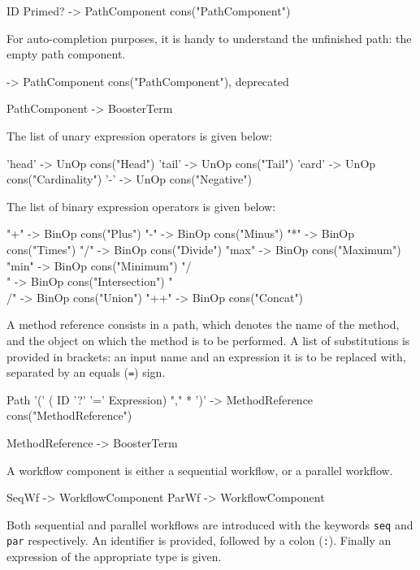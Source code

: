 \begin{code}
ID Primed? -> PathComponent {cons("PathComponent")}
\end{code}

For auto-completion purposes, it is handy to understand the unfinished
path: the empty path component.
\begin{code}
  -> PathComponent {cons("PathComponent"), deprecated}

PathComponent -> BoosterTerm
\end{code}

The list of unary expression operators is given below:

\begin{code}
'head' -> UnOp {cons("Head")}
'tail' -> UnOp {cons("Tail")}
'card' -> UnOp {cons("Cardinality")}
'-'    -> UnOp {cons("Negative")}
\end{code}

The list of binary expression operators is given below:

\begin{code}
"+"	-> BinOp {cons("Plus")}
"-" 	-> BinOp {cons("Minus")}
"*" 	-> BinOp {cons("Times")}
"/" 	-> BinOp {cons("Divide")}
"max" 	-> BinOp {cons("Maximum")}
"min" 	-> BinOp {cons("Minimum")}
"/\\" 	-> BinOp {cons("Intersection")}
"\\/" 	-> BinOp {cons("Union")}
"++" 	-> BinOp {cons("Concat")}
\end{code}


A method reference consists in a path, which denotes the name of the
method, and the object on which the method is to be performed.  A list
of substitutions is provided in brackets: an input name and an
expression it is to be replaced with, separated by an equals
(\verb|=|) sign.

\begin{code}
Path '(' { ( ID '?' '=' Expression) "," }* ')' 
                            -> MethodReference {cons("MethodReference")}

MethodReference -> BoosterTerm
\end{code}

A workflow component is either a sequential workflow, or a parallel
workflow.

\begin{code}
SeqWf -> WorkflowComponent
ParWf -> WorkflowComponent
\end{code}

Both sequential and parallel workflows are introduced with the
keywords \verb|seq| and \verb|par| respectively.  An identifier is
provided, followed by a colon (\verb|:|).  Finally an expression
of the appropriate type is given.

